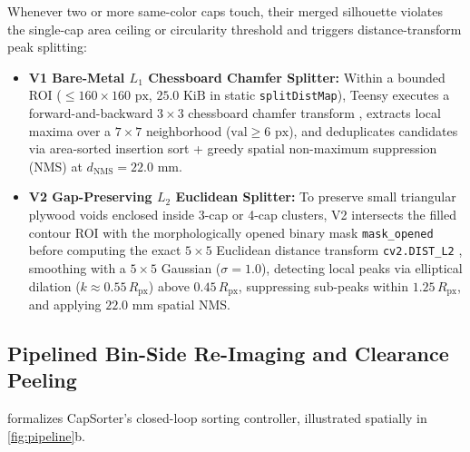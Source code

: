 \documentclass[10pt,twocolumn,letterpaper]{article}
\begin{document}
Whenever two or more same-color caps touch, their merged silhouette violates the single-cap area ceiling or circularity threshold and triggers distance-transform peak splitting:
\begin{itemize}
  \item \textbf{V1 Bare-Metal $L_1$ Chessboard Chamfer Splitter:} Within a bounded ROI ($\le 160\times 160\text{ px}$, $25.0\text{ KiB}$ in static \texttt{splitDistMap}), Teensy executes a forward-and-backward $3\times 3$ chessboard chamfer transform \cite{borgefors1986distance}, extracts local maxima over a $7\times 7$ neighborhood ($\text{val} \ge 6\text{ px}$), and deduplicates candidates via area-sorted insertion sort + greedy spatial non-maximum suppression (NMS) at $d_{\mathrm{NMS}} = 22.0\text{ mm}$.
  \item \textbf{V2 Gap-Preserving $L_2$ Euclidean Splitter:} To preserve small triangular plywood voids enclosed inside 3-cap or 4-cap clusters, V2 intersects the filled contour ROI with the morphologically opened binary mask \texttt{mask\_opened} before computing the exact $5\times 5$ Euclidean distance transform \texttt{cv2.DIST\_L2} \cite{felzenszwalb2012distance}, smoothing with a $5\times 5$ Gaussian ($\sigma=1.0$), detecting local peaks via elliptical dilation ($k \approx 0.55\,R_{\mathrm{px}}$) above $0.45\,R_{\mathrm{px}}$, suppressing sub-peaks within $1.25\,R_{\mathrm{px}}$, and applying $22.0\text{ mm}$ spatial NMS.
\end{itemize}

\subsection{Pipelined Bin-Side Re-Imaging and Clearance Peeling}
\label{sec:closed_loop}
 formalizes CapSorter's closed-loop sorting controller, illustrated spatially in \cref{fig:pipeline}b.
\end{document}
